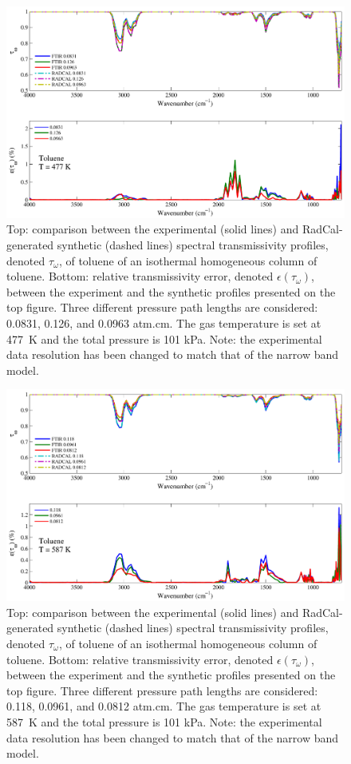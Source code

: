 \begin{figure}[p]
\includegraphics[width=\textwidth]{../Verification/Results_Test2/Toluene_477.pdf}
\caption{Top: comparison between the experimental (solid lines) and RadCal-generated synthetic (dashed lines) spectral transmissivity profiles, denoted $\tau_{\omega}$, of toluene of an isothermal homogeneous column of toluene. Bottom: relative transmissivity error, denoted $\epsilon{(\tau_{\omega})}$, between the experiment and the synthetic profiles presented on the top figure. Three different pressure path lengths are considered: 0.0831, 0.126, and 0.0963 atm.cm. The gas temperature is set at 477~K and the total pressure is 101 kPa. Note: the experimental data resolution has been changed to match that of the narrow band model. \label{fig:toluene_Verify_477K}}
\end{figure}

\begin{figure}[p]
\includegraphics[width=\textwidth]{../Verification/Results_Test2/Toluene_587.pdf}
\caption{Top: comparison between the experimental (solid lines) and RadCal-generated synthetic (dashed lines) spectral transmissivity profiles, denoted $\tau_{\omega}$, of toluene of an isothermal homogeneous column of toluene. Bottom: relative transmissivity error, denoted $\epsilon{(\tau_{\omega})}$, between the experiment and the synthetic profiles presented on the top figure. Three different pressure path lengths are considered: 0.118, 0.0961, and 0.0812 atm.cm. The gas temperature is set at 587~K and the total pressure is 101 kPa. Note: the experimental data resolution has been changed to match that of the narrow band model. \label{fig:toluene_Verify_587K}}
\end{figure}


